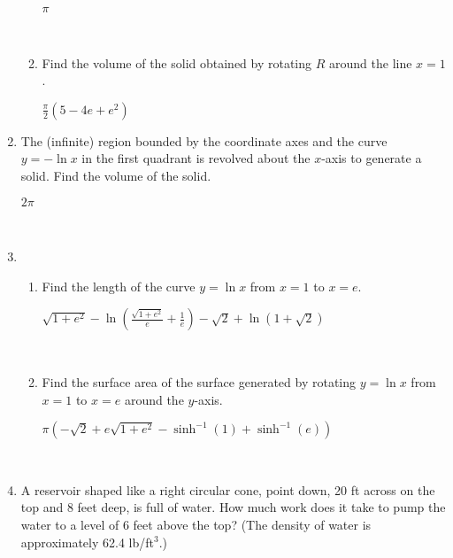 \documentclass[]{handout}
\begin{document}
\begin{enumerate}[(1)]
\begin{enumerate}
\begin{answer} 
		$\pi$
\end{answer}

		\

		\item Find the volume of the solid obtained by rotating $R$ around the line $x = 1$.

\begin{answer} 
		$\displaystyle\frac{\pi}{2}(5- 4e +e^2)$
\end{answer}

	\end{enumerate}

	\item The (infinite) region bounded by the coordinate axes and the curve $y = - \ln x$
		in the first quadrant is revolved about the $x$-axis to generate a solid.  Find
		the volume of the solid.  %

\begin{answer}
		 $2 \pi$
\end{answer}

		\

	\item  \begin{enumerate}

		\item Find the length of the curve $y = \ln x$ from $x = 1$ to $x = e$. %

\begin{answer} 
		$\displaystyle \sqrt{1+e^2} - \ln\left(\frac{\sqrt{1+e^2}}{e} + \frac{1}{e}\right) - \sqrt{2} + \ln(1+ \sqrt 2)$
\end{answer}

		\

		\item Find the surface area of the surface generated by rotating
			$y = \ln x$ from $x = 1$ to $x = e$ around the $y$-axis. %

\begin{answer} 
		$\displaystyle \pi\left( - \sqrt 2 + e \sqrt{1+e^2} - \sinh^{-1}(1) + \sinh^{-1}(e) \right)$
\end{answer}

		\

	\end{enumerate}


	\item A reservoir shaped like a right circular cone, point down, 20 ft across on the top
		and 8 feet deep, is full of water.  How much work does it take to pump the
		water to a level of 6 feet above the top?  (The density of water is approximately
		62.4 lb/ft$^3$.)  %


\end{enumerate}
\end{document}
